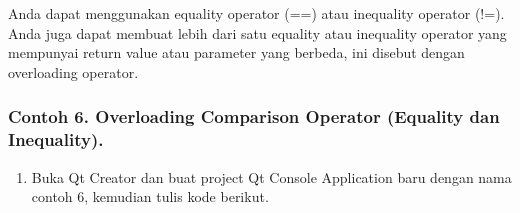 Anda dapat menggunakan equality operator (==) atau inequality operator
(!=). Anda juga dapat membuat lebih dari satu equality atau inequality
operator yang mempunyai return value atau parameter yang berbeda, ini
disebut dengan overloading operator.

\subsubsection*{Contoh 6. Overloading Comparison Operator (Equality dan Inequality).}

\begin{enumerate}
\def\labelenumi{\arabic{enumi}.}
\item
  Buka Qt Creator dan buat project Qt Console Application baru dengan
  nama contoh 6, kemudian tulis kode berikut.


\end{enumerate}
